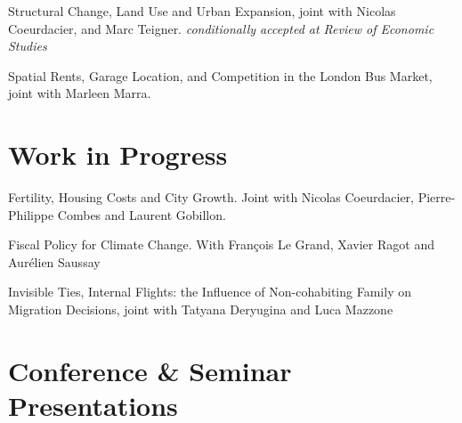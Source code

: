 \documentclass[letterpaper]{article}
\renewenvironment{itemize}{
  \begin{list}{}{
    \setlength{\leftmargin}{1.5em}
  }
}{
  \end{list}
}
\begin{document}
\begin{itemize}

\item Structural Change, Land Use and Urban Expansion, joint with Nicolas Coeurdacier, and Marc Teigner. {\it conditionally accepted at Review of Economic Studies}


\item Spatial Rents, Garage Location, and Competition in the London Bus Market, joint with Marleen Marra.
\end{itemize}

\section*{Work in Progress}

\begin{itemize}
\item Fertility, Housing Costs and City Growth. Joint with Nicolas Coeurdacier, Pierre-Philippe Combes and Laurent Gobillon.
\item Fiscal Policy for Climate Change. With François Le Grand, Xavier Ragot and Aurélien Saussay
\item Invisible Ties, Internal Flights: the Influence of Non-cohabiting Family on Migration Decisions, joint with Tatyana Deryugina and Luca Mazzone
\end{itemize}

\section*{Conference \& Seminar Presentations}
\end{document}
